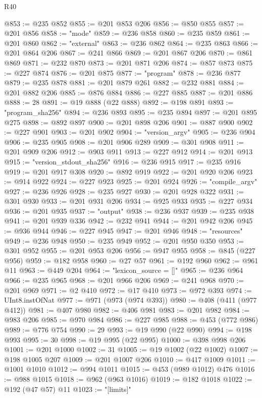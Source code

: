 \begin{lexlean}{R40}
\begin{coremodule}
@853 := @235 @852
@855 := @201 @853 @206
@856 := @850 @855
@857 := @201 @856
@858 := "mode"
@859 := @236 @858
@860 := @235 @859
@861 := @201 @860
@862 := "external"
@863 := @236 @862
@864 := @235 @863
@866 := @201 @864 @206
@867 := @241 @866
@869 := @201 @867 @206
@870 := @861 @869
@871 := @232 @870
@873 := @201 @871 @206
@874 := @857 @873
@875 := @227 @874
@876 := @201 @875
@877 := "program"
@878 := @236 @877
@879 := @235 @878
@881 := @201 @879 @261
@882 := @232 @881
@884 := @201 @882 @206
@885 := @876 @884
@886 := @227 @885
@887 := @201 @886
@888 := 28
@891 := @19 @888 (@22 @888)
@892 := @198 @891
@893 := "program_sha256"
@894 := @236 @893
@895 := @235 @894
@897 := @201 @895 @275
@898 := @892 @897
@900 := @201 @898 @206
@901 := @887 @900
@902 := @227 @901
@903 := @201 @902
@904 := "version_argv"
@905 := @236 @904
@906 := @235 @905
@908 := @201 @906 @289
@909 := @301 @908
@911 := @201 @909 @206
@912 := @903 @911
@913 := @227 @912
@914 := @201 @913
@915 := "version_stdout_sha256"
@916 := @236 @915
@917 := @235 @916
@919 := @201 @917 @308
@920 := @892 @919
@922 := @201 @920 @206
@923 := @914 @922
@924 := @227 @923
@925 := @201 @924
@926 := "compile_argv"
@927 := @236 @926
@928 := @235 @927
@930 := @201 @928 @322
@931 := @301 @930
@933 := @201 @931 @206
@934 := @925 @933
@935 := @227 @934
@936 := @201 @935
@937 := "output"
@938 := @236 @937
@939 := @235 @938
@941 := @201 @939 @336
@942 := @232 @941
@944 := @201 @942 @206
@945 := @936 @944
@946 := @227 @945
@947 := @201 @946
@948 := "resources"
@949 := @236 @948
@950 := @235 @949
@952 := @201 @950 @350
@953 := @301 @952
@955 := @201 @953 @206
@956 := @947 @955
@958 := @845 (@227 @956)
@959 := @182 @958
@960 := @27 @57
@961 := @192 @960
@962 := @961 @11
@963 := @449 @204
@964 := "lexicon_source = []"
@965 := @236 @964
@966 := @235 @965
@968 := @201 @966 @206
@969 := @241 @968
@970 := @201 @969
@971 := @2 @410
@972 := @17 @410
@973 := @972 @393
@974 := UInt8.instOfNat
@977 := @971 (@973 (@974 @393))
@980 := @408 (@411 (@977 @412))
@981 := @407 @980
@982 := @406 @981
@983 := @201 @982
@984 := @983 @206
@985 := @970 @984
@986 := @227 @985
@988 := @453 (@772 @986)
@989 := @776 @754
@990 := 29
@993 := @19 @990 (@22 @990)
@994 := @198 @993
@995 := 30
@998 := @19 @995 (@22 @995)
@1000 := @398 @998 @206
@1001 := @201 @1000
@1002 := 31
@1005 := @19 @1002 (@22 @1002)
@1007 := @198 @1005 @207
@1009 := @201 @1007 @206
@1010 := @417 @1009
@1011 := @1001 @1010
@1012 := @994 @1011
@1015 := @453 (@989 @1012) @476
@1016 := @988 @1015
@1018 := @962 (@963 @1016)
@1019 := @182 @1018
@1022 := @192 (@47 @57) @11
@1023 := "[limits]"

\end{coremodule}
\end{lexlean}
